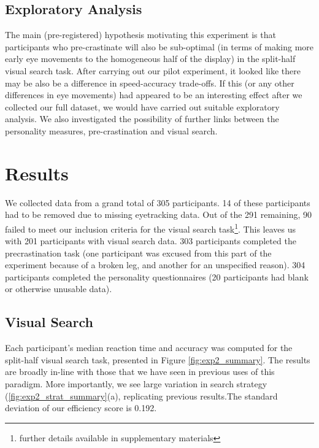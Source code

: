 \documentclass[]{rsos}
\begin{document}
\subsection{Exploratory Analysis}

The main (pre-registered) hypothesis motivating this experiment is that participants who pre-crastinate will also be sub-optimal (in terms of making more early eye movements to the homogeneous half of the display) in the split-half visual search task. After carrying out our pilot experiment, it looked like there may be also be a difference in speed-accuracy trade-offs. If this (or any other differences in eye movements) had appeared to be an interesting effect after we collected our full dataset, we would have carried out suitable exploratory analysis. We also investigated the possibility of further links between the personality measures, pre-crastination and visual search. 

\section{Results}

We collected data from a grand total of 305 participants. 14 of these participants had to be removed due to missing eyetracking data. Out of the 291 remaining, 90 failed to meet our inclusion criteria for the visual search task\footnote{further details available in supplementary materials}. This leaves us with 201 participants with visual search data. 303 participants completed the precrastination task (one participant was excused from this part of the experiment because of a broken leg, and another for an unspecified reason). 304 participants completed the personality questionnaires (20 participants had blank or otherwise unusable data).

\subsection{Visual Search}

Each participant’s median reaction time and accuracy was computed for the split-half visual
search task, presented in Figure \ref{fig:exp2_summary}. The results are broadly in-line with those that we have seen in previous uses of this paradigm. More importantly, we see large variation in search strategy (\ref{fig:exp2_strat_summary}(a), replicating previous results.The standard deviation of our efficiency score is 0.192.
\end{document}
